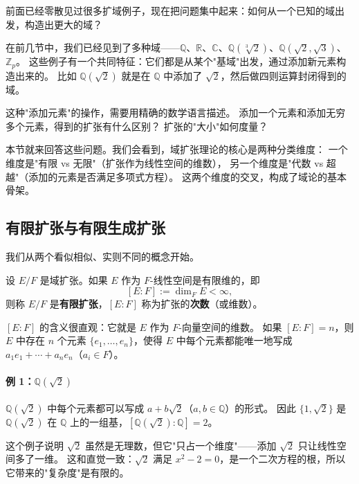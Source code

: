 前面已经零散见过很多扩域例子，现在把问题集中起来：如何从一个已知的域出发，构造出更大的域？

在前几节中，我们已经见到了多种域——$\mathbb{Q}$、$\mathbb{R}$、$\mathbb{C}$、$\mathbb{Q}(\sqrt[3]{2})$、$\mathbb{Q}(\sqrt{2},\sqrt{3})$、$\mathbb{Z}_p$。
这些例子有一个共同特征：它们都是从某个"基域"出发，通过添加新元素构造出来的。
比如 $\mathbb{Q}(\sqrt{2})$ 就是在 $\mathbb{Q}$ 中添加了 $\sqrt{2}$，然后做四则运算封闭得到的域。

这种"添加元素"的操作，需要用精确的数学语言描述。
添加一个元素和添加无穷多个元素，得到的扩张有什么区别？
扩张的"大小"如何度量？

本节就来回答这些问题。我们会看到，域扩张理论的核心是两种分类维度：
一个维度是"有限 vs 无限"（扩张作为线性空间的维数），
另一个维度是"代数 vs 超越"（添加的元素是否满足多项式方程）。
这两个维度的交叉，构成了域论的基本骨架。

\subsection{有限扩张与有限生成扩张}

我们从两个看似相似、实则不同的概念开始。

\begin{definition}[有限扩张]\label{def:finite-extension}
设 $E/F$ 是域扩张。如果 $E$ 作为 $F$-线性空间是有限维的，即
\[[E:F] := \dim_F E < \infty,\]
则称 $E/F$ 是\textbf{有限扩张}，$[E:F]$ 称为扩张的\textbf{次数}（或维数）。
\end{definition}

$[E:F]$ 的含义很直观：它就是 $E$ 作为 $F$-向量空间的维数。
如果 $[E:F] = n$，则 $E$ 中存在 $n$ 个元素 $\{e_1, \ldots, e_n\}$，使得 $E$ 中每个元素都能唯一地写成 $a_1 e_1 + \cdots + a_n e_n$（$a_i \in F$）。

\paragraph*{例 1：$\mathbb{Q}(\sqrt{2})$}
$\mathbb{Q}(\sqrt{2})$ 中每个元素都可以写成 $a + b\sqrt{2}$（$a, b \in \mathbb{Q}$）的形式。
因此 $\{1, \sqrt{2}\}$ 是 $\mathbb{Q}(\sqrt{2})$ 在 $\mathbb{Q}$ 上的一组基，$[\mathbb{Q}(\sqrt{2}):\mathbb{Q}] = 2$。

这个例子说明 $\sqrt{2}$ 虽然是无理数，但它"只占一个维度"——添加 $\sqrt{2}$ 只让线性空间多了一维。
这和直觉一致：$\sqrt{2}$ 满足 $x^2 - 2 = 0$，是一个二次方程的根，所以它带来的"复杂度"是有限的。

